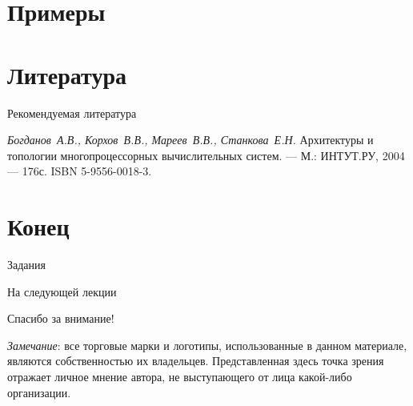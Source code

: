 \section{Примеры}

\section{Литература}

\begin{frame}[allowframebreaks]{Рекомендуемая литература}
\begin{thebibliography}{99}
    \bibitem{} \textit{Богданов~А.В., Корхов~В.В., Мареев~В.В., Станкова~Е.Н.}
    Архитектуры и топологии многопроцессорных вычислительных систем. --- М.:
    ИНТУТ.РУ, 2004 --- 176с. ISBN 5-9556-0018-3.
\end{thebibliography}
\end{frame}

\section*{Конец}

\begin{frame}{Задания}
\end{frame}

\begin{frame}{На следующей лекции}
\end{frame}

\begin{frame}

{\huge{Спасибо за внимание!}\par}

\vfill

\tiny{\textit{Замечание}: все торговые марки и логотипы, использованные в данном материале, являются собственностью их владельцев. Представленная здесь точка зрения отражает личное мнение автора, не выступающего от лица какой-либо организации.}

\end{frame}


